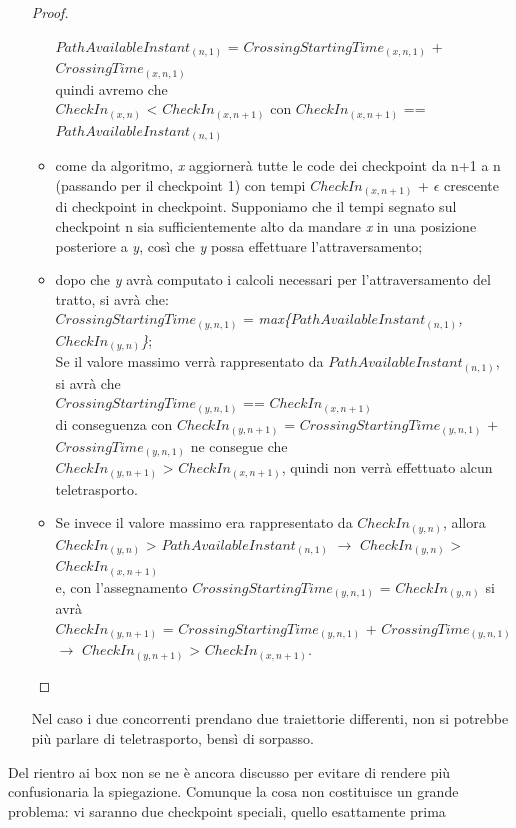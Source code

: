 \begin{itemize}
\begin{proof}
\begin{itemize}
$PathAvailableInstant_{(n,1)}$ = $CrossingStartingTime_{(x,n,1)}$ + $CrossingTime_{(x,n,1)}$\\
quindi avremo che\\
$CheckIn_{(x,n)}$ < $CheckIn_{(x,n+1)}$ con $CheckIn_{(x,n+1)}$ == $PathAvailableInstant_{(n,1)}$
\item come da algoritmo, \emph{x} aggiornerà tutte le code dei checkpoint da n+1 a n (passando per il checkpoint 1) con tempi $CheckIn_{(x,n+1)}$ + $\epsilon$ 
crescente di checkpoint in checkpoint. Supponiamo che il tempi segnato sul checkpoint n sia sufficientemente alto da mandare \emph{x}
in una posizione posteriore a \emph{y}, così che \emph{y} possa effettuare l'attraversamento;
\item dopo che \emph{y} avrà computato i calcoli necessari per l'attraversamento del tratto, si avrà che:\\
$CrossingStartingTime_{(y,n,1)}$ = \emph{max\{$PathAvailableInstant_{(n,1)}$,$CheckIn_{(y,n)}$\}};\\
Se il valore massimo verrà rappresentato da $PathAvailableInstant_{(n,1)}$, si avrà che \\
$CrossingStartingTime_{(y,n,1)}$ == $CheckIn_{(x,n+1)}$\\
di conseguenza con $CheckIn_{(y,n+1)}$ = $CrossingStartingTime_{(y,n,1)}$ + $CrossingTime_{(y,n,1)}$ ne consegue che\\
$CheckIn_{(y,n+1)}$ > $CheckIn_{(x,n+1)}$, quindi non verrà effettuato alcun teletrasporto.
\item Se invece il valore massimo era rappresentato da $CheckIn_{(y,n)}$, allora\\ 
$CheckIn_{(y,n)}$ > $PathAvailableInstant_{(n,1)}$ $\rightarrow$ $CheckIn_{(y,n)}$ > $CheckIn_{(x,n+1)}$ \\e, con l'assegnamento
$CrossingStartingTime_{(y,n,1)}$ = $CheckIn_{(y,n)}$ si avrà \\
$CheckIn_{(y,n+1)}$ = $CrossingStartingTime_{(y,n,1)}$ + $CrossingTime_{(y,n,1)}$ \\
$\rightarrow$ $CheckIn_{(y,n+1)}$ > $CheckIn_{(x,n+1)}$.
\end{itemize}
\end{proof}
Nel caso i due concorrenti prendano due traiettorie differenti, non si potrebbe più parlare di teletrasporto, bensì di sorpasso.
\end{itemize}
Del rientro ai box non se ne \`{e} ancora discusso per evitare di rendere
pi\`{u} confusionaria la spiegazione. Comunque la cosa non costituisce
un grande problema: vi saranno due checkpoint speciali, quello esattamente prima
